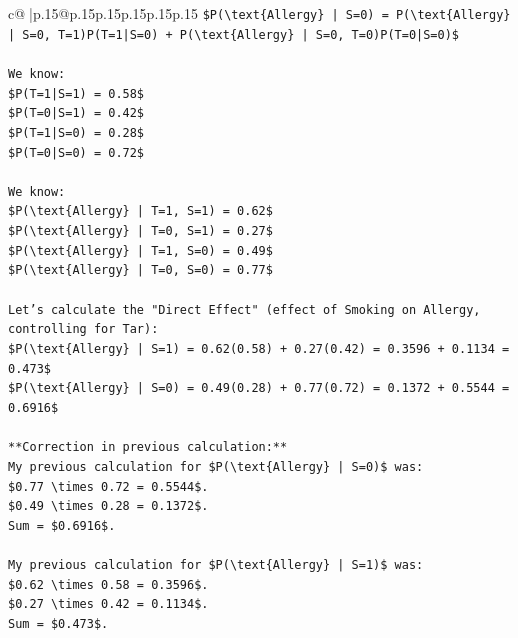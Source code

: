 \documentclass{article}
\begin{document}
{\begin{supertabular}{c@{$\;$}|p{.15\linewidth}@{}p{.15\linewidth}p{.15\linewidth}p{.15\linewidth}p{.15\linewidth}p{.15\linewidth}}
{{{\texttt{\$P(\textbackslash{}text\{Allergy\} | S=0) = P(\textbackslash{}text\{Allergy\} | S=0, T=1)P(T=1|S=0) + P(\textbackslash{}text\{Allergy\} | S=0, T=0)P(T=0|S=0)\$} \\
\\ 
\texttt{We know:} \\
\texttt{\$P(T=1|S=1) = 0.58\$} \\
\texttt{\$P(T=0|S=1) = 0.42\$} \\
\texttt{\$P(T=1|S=0) = 0.28\$} \\
\texttt{\$P(T=0|S=0) = 0.72\$} \\
\\ 
\texttt{We know:} \\
\texttt{\$P(\textbackslash{}text\{Allergy\} | T=1, S=1) = 0.62\$} \\
\texttt{\$P(\textbackslash{}text\{Allergy\} | T=0, S=1) = 0.27\$} \\
\texttt{\$P(\textbackslash{}text\{Allergy\} | T=1, S=0) = 0.49\$} \\
\texttt{\$P(\textbackslash{}text\{Allergy\} | T=0, S=0) = 0.77\$} \\
\\ 
\texttt{Let's calculate the "Direct Effect" (effect of Smoking on Allergy, controlling for Tar):} \\
\texttt{\$P(\textbackslash{}text\{Allergy\} | S=1) = 0.62(0.58) + 0.27(0.42) = 0.3596 + 0.1134 = 0.473\$} \\
\texttt{\$P(\textbackslash{}text\{Allergy\} | S=0) = 0.49(0.28) + 0.77(0.72) = 0.1372 + 0.5544 = 0.6916\$} \\
\\ 
\texttt{**Correction in previous calculation:**} \\
\texttt{My previous calculation for \$P(\textbackslash{}text\{Allergy\} | S=0)\$ was:} \\
\texttt{\$0.77 \textbackslash{}times 0.72 = 0.5544\$.} \\
\texttt{\$0.49 \textbackslash{}times 0.28 = 0.1372\$.} \\
\texttt{Sum = \$0.6916\$.} \\
\\ 
\texttt{My previous calculation for \$P(\textbackslash{}text\{Allergy\} | S=1)\$ was:} \\
\texttt{\$0.62 \textbackslash{}times 0.58 = 0.3596\$.} \\
\texttt{\$0.27 \textbackslash{}times 0.42 = 0.1134\$.} \\
\texttt{Sum = \$0.473\$.} \\
}}}
\end{supertabular}}
\end{document}
